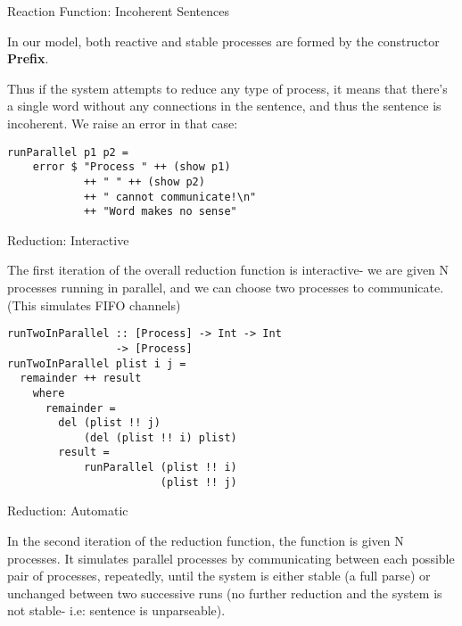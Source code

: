 \documentclass{article}
\begin{document}
\begin{frame}[fragile]{Reaction Function: Incoherent Sentences}

In our model, both reactive and stable processes are formed by the constructor \textbf{Prefix}.

Thus if the system attempts to reduce any type of process, it means that there's a single
word without any connections in the sentence, and thus the sentence is incoherent. We raise
an error in that case:  

\begin{lstlisting}
runParallel p1 p2 = 
	error $ "Process " ++ (show p1) 
            ++ " " ++ (show p2)
            ++ " cannot communicate!\n"
            ++ "Word makes no sense" 
\end{lstlisting}

\end{frame}

\begin{frame}[fragile]{Reduction: Interactive}

The first iteration of the overall reduction function is interactive- we are given N processes running in parallel, and we can choose two processes to communicate. (This simulates FIFO channels)

\begin{lstlisting}
runTwoInParallel :: [Process] -> Int -> Int 
                 -> [Process]
runTwoInParallel plist i j =
  remainder ++ result
	where 
	  remainder = 
		del (plist !! j) 
			(del (plist !! i) plist)
		result = 
			runParallel (plist !! i) 
			            (plist !! j)
\end{lstlisting}

\end{frame}

\begin{frame}[fragile]{Reduction: Automatic}

In the second iteration of the reduction function, the function is given N processes. It simulates parallel processes by communicating between each possible pair of processes, repeatedly, until the system is either stable (a full parse) or unchanged between two successive runs (no further reduction and the system is not stable- i.e: sentence is unparseable).


\end{frame}
\end{document}
